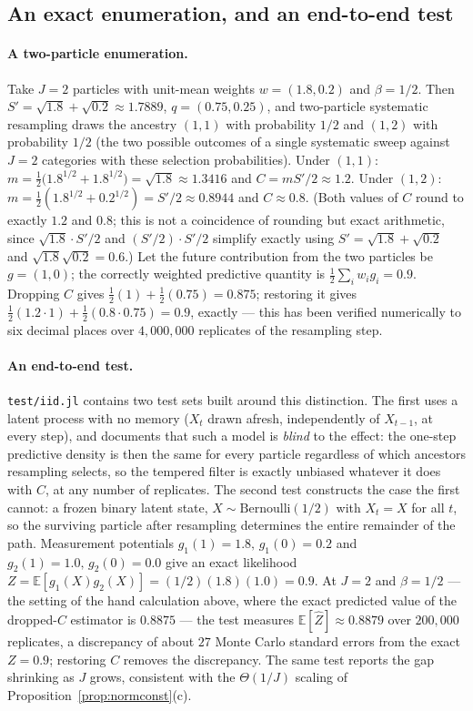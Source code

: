 \documentclass[11pt]{article}
\newcommand{\E}{\mathbb{E}}
\begin{document}
\subsection{An exact enumeration, and an end-to-end test}
\label{sec:exact-case}

\paragraph{A two-particle enumeration.} Take $J=2$ particles with unit-mean
weights $w=(1.8,0.2)$ and $\beta=1/2$. Then $S'=\sqrt{1.8}+\sqrt{0.2}\approx
1.7889$, $q=(0.75,0.25)$, and two-particle systematic resampling draws the
ancestry $(1,1)$ with probability $1/2$ and $(1,2)$ with probability $1/2$
(the two possible outcomes of a single systematic sweep against $J=2$
categories with these selection probabilities). Under $(1,1)$: $m =
\frac12\big(1.8^{1/2}+1.8^{1/2}\big)=\sqrt{1.8}\approx1.3416$ and
$C=mS'/2\approx1.2$. Under $(1,2)$: $m=\frac12(1.8^{1/2}+0.2^{1/2})
=S'/2\approx0.8944$ and $C\approx0.8$. (Both values of $C$ round to exactly
$1.2$ and $0.8$; this is not a coincidence of rounding but exact arithmetic,
since $\sqrt{1.8}\cdot S'/2$ and $(S'/2)\cdot S'/2$ simplify exactly using
$S'=\sqrt{1.8}+\sqrt{0.2}$ and $\sqrt{1.8}\sqrt{0.2}=0.6$.) Let the future
contribution from the two particles be $g=(1,0)$; the correctly weighted
predictive quantity is $\frac12\sum_i w_i g_i = 0.9$. Dropping $C$ gives
$\frac12(1)+\frac12(0.75)=0.875$; restoring it gives
$\frac12(1.2\cdot1)+\frac12(0.8\cdot0.75)=0.9$, exactly — this has been
verified numerically to six decimal places over $4{,}000{,}000$ replicates
of the resampling step.

\paragraph{An end-to-end test.} \texttt{test/iid.jl} contains two test sets
built around this distinction. The first uses a latent process with no
memory ($X_t$ drawn afresh, independently of $X_{t-1}$, at every step), and
documents that such a model is \emph{blind} to the effect: the one-step
predictive density is then the same for every particle regardless of which
ancestors resampling selects, so the tempered filter is exactly unbiased
whatever it does with $C$, at any number of replicates. The second test
constructs the case the first cannot: a frozen binary latent state,
$X\sim\mathrm{Bernoulli}(1/2)$ with $X_t=X$ for all $t$, so the surviving
particle after resampling determines the entire remainder of the path.
Measurement potentials $g_1(1)=1.8,\,g_1(0)=0.2$ and $g_2(1)=1.0,\,g_2(0)=0.0$
give an exact likelihood $Z=\E[g_1(X)g_2(X)]=(1/2)(1.8)(1.0)=0.9$. At $J=2$
and $\beta=1/2$ — the setting of the hand calculation above, where the exact
predicted value of the dropped-$C$ estimator is $0.8875$ — the test measures
$\E[\hat Z]\approx0.8879$ over $200{,}000$ replicates, a discrepancy of
about $27$ Monte Carlo standard errors from the exact $Z=0.9$; restoring $C$
removes the discrepancy. The same test reports the gap shrinking as $J$
grows, consistent with the $\Theta(1/J)$ scaling of
Proposition~\ref{prop:normconst}(c).
\end{document}

